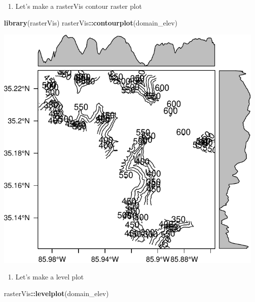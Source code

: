 \documentclass[
]{book}
\newenvironment{Shaded}{\begin{snugshade}}{\end{snugshade}}
\newcommand{\KeywordTok}[1]{\textcolor[rgb]{0.13,0.29,0.53}{\textbf{#1}}}
\newcommand{\NormalTok}[1]{#1}
\newcommand{\OperatorTok}[1]{\textcolor[rgb]{0.81,0.36,0.00}{\textbf{#1}}}
\providecommand{\tightlist}{%
  \setlength{\itemsep}{0pt}\setlength{\parskip}{0pt}}
\begin{document}
\begin{enumerate}
\def\labelenumi{\arabic{enumi}.}
\setcounter{enumi}{27}
\tightlist
\item
  Let's make a rasterVis contour raster plot
\end{enumerate}

\begin{Shaded}
\begin{Highlighting}[]
\KeywordTok{library}\NormalTok{(rasterVis)}
\NormalTok{rasterVis}\OperatorTok{::}\KeywordTok{contourplot}\NormalTok{(domain_elev)}
\end{Highlighting}
\end{Shaded}

\includegraphics{figures/unnamed-chunk-573-1.pdf}

\begin{enumerate}
\def\labelenumi{\arabic{enumi}.}
\setcounter{enumi}{28}
\tightlist
\item
  Let's make a level plot
\end{enumerate}

\begin{Shaded}
\begin{Highlighting}[]
\NormalTok{rasterVis}\OperatorTok{::}\KeywordTok{levelplot}\NormalTok{(domain_elev)}
\end{Highlighting}
\end{Shaded}
\end{document}
